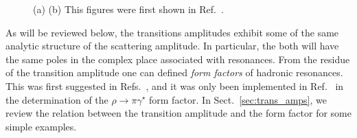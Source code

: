 \documentclass{iopart}
\theoremstyle{definition}
\begin{document}
{%
\begin{figure}[t]
\centering
{}
\hspace{.1cm} 
\caption{ (a)  (b)  This figures were first shown in Ref.~\cite{Briceno:2016cxt}.}
\label{fig:flow_charts} 
\end{figure}

As will be reviewed below, the transitions amplitudes exhibit some of the same analytic structure of the scattering amplitude. In particular, the both will have the same poles in the complex place associated with resonances. From the residue of the transition amplitude one can defined \emph{form factors} of hadronic resonances. This was first suggested in Refs.~\cite{Bernard:2012bi, Agadjanov:2014kha, Briceno:2015csa}, and it was only been implemented in Ref.~\cite{Briceno:2015dca} in the determination of the $\rho\to\pi\gamma^\star$ form factor. In Sect.~\ref{sec:trans_amps}, we review the relation between the transition amplitude and the form factor for some simple examples. 

}
\end{document}
